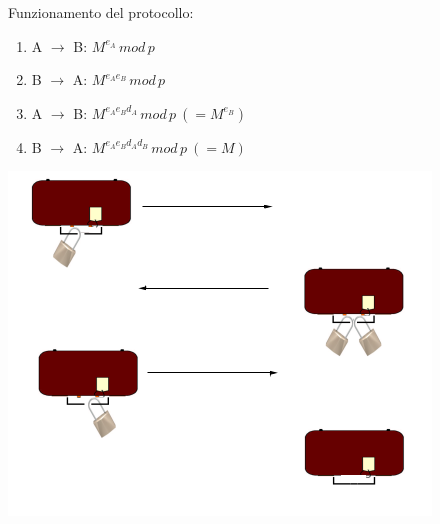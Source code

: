 \documentclass[a4paper, 11pt, twoside, openright, fleqn]{report}
\begin{document}
\begin{minipage}{.6\textwidth}
\noindent Funzionamento del protocollo:
\begin{enumerate}
	\item A $\rightarrow$ B: $M^{e_A}\,mod\,p$
	\item B $\rightarrow$ A: $M^{e_Ae_B}\,mod\,p$
	\item A $\rightarrow$ B: $M^{e_Ae_Bd_A}\,mod\,p\ (=M^{e_B})$
	\item B $\rightarrow$ A: $M^{e_Ae_Bd_Ad_B}\,mod\,p\ (= M)$
\end{enumerate}
\end{minipage}
\begin{minipage}{.4\textwidth}
	\centering
	\includegraphics[width=.9\textwidth]{images/MasseyOmura}
\end{minipage}
\end{document}
